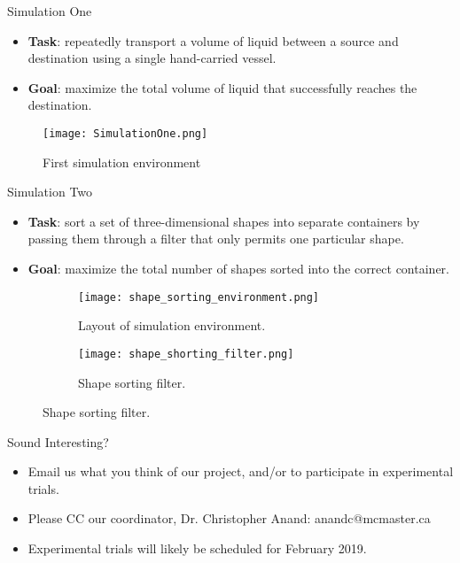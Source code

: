 \documentclass[22pt]{beamer}
\begin{document}
\begin{frame}[fragile]
\begin{textblock}{7.25}
\begin{block}{Simulation One}\newline
\begin{itemize}
\item \textbf{Task}: repeatedly transport a
volume of liquid between a source and destination using a single hand-carried vessel.
\item \textbf{Goal}: maximize the total volume of liquid that successfully reaches the destination.
\end{itemize}

\begin{figure}
  \centering
  \texttt{[image: SimulationOne.png]}
  \caption{First simulation environment}
\label{fig:simOne}
\end{figure}

\end{block}



\begin{block}{Simulation Two}\newline
\begin{itemize}
\item \textbf{Task}: sort a set of three-dimensional shapes into separate containers by passing them through a filter that only permits one particular shape.
\item \textbf{Goal}: maximize the total number of shapes sorted into the correct container.
\end{itemize}
\begin{figure}
  \begin{subfigure}[b]{0.37\textwidth}
    \texttt{[image: shape\_sorting\_environment.png]}
    \caption{Layout of simulation environment.}
  \end{subfigure}
  \begin{subfigure}[b]{0.60\textwidth}
    \texttt{[image: shape\_shorting\_filter.png]}
    \caption{Shape sorting filter.}
    \end{subfigure}
 \end{figure}
\end{block}


\begin{block}{Sound Interesting?}\newline
\begin{itemize}
\item Email us what you think of our project, and/or to participate in experimental trials.
\item Please CC our coordinator, Dr. Christopher Anand: anandc@mcmaster.ca
\item Experimental trials will likely be scheduled for February 2019.
\end{itemize}
\end{block}



\end{textblock}
\end{frame}
\end{document}
